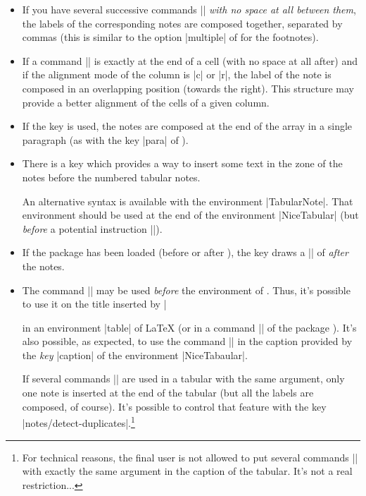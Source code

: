 \documentclass[dvipsnames]{article}%
\begin{document}
\bigskip
\begin{itemize}
\item If you have several successive commands || \emph{with no
space at all between them}, the labels of the corresponding notes are composed
together, separated by commas (this is similar to the option |multiple| of
 for the footnotes).

\item If a command || is exactly at the end of a cell (with no
space at all after) and if the alignment mode of the column is |c| or |r|, the
label of the note is composed in an overlapping position (towards the right).
This structure may provide a better alignment of the cells of a given column.

\item If the key  is used, the notes are composed at the
end of the array in a single paragraph (as with the key |para| of
). 

\item {}
There is a key  which provides a way to insert some text
in the zone of the notes before the numbered tabular notes.

An alternative syntax is available with the environment |{TabularNote}|. That
environment should be used at the end of the environment |{NiceTabular}| (but
\emph{before} a potential instruction |\CodeAfter|).

\item If the package  has been loaded (before or after
), the key  draws a |\bottomrule|
of  \emph{after} the notes. 

\item The command |\tabularnote| may be used \emph{before}
the environment of . Thus, it's possible to use it on the
title inserted by |\caption| in an environment |{table}| of LaTeX (or in a
command |\captionof| of the package ). It's also possible, as
expected, to use the command |\tabularnote| in the caption provided by the
\emph{key} |caption| of the environment |{NiceTabaular}|.

If several commands |\tabularnote| are used in a tabular with the same
argument, only one note is inserted at the end of the tabular (but all the
labels are composed, of course). It's possible to control that feature with
the key |notes/detect-duplicates|.\footnote{For technical reasons, the final
user is not allowed to put several commands |\tabularnote| with exactly the
same argument in the caption of the tabular. It's not a real restriction...}


\end{itemize}
\end{document}
